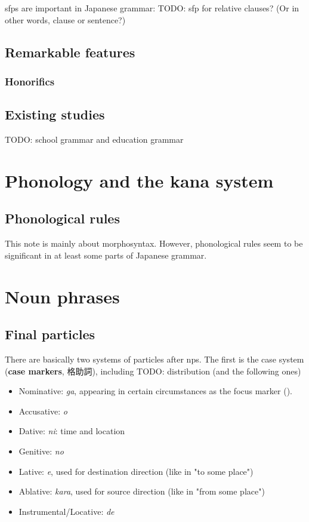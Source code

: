 \documentclass[UTF8, a4paper, oneside, scheme=plain]{ctexart}
\newcommand*{\concept}[1]{\textbf{#1}}
\newcommand{\corpus}[1]{\emph{#1}}
\begin{document}
\acs{sfp}s are important in Japanese grammar:
TODO: sfp for relative clauses? (Or in other words, clause or sentence?)

\subsection{Remarkable features}

\subsubsection{Honorifics}

\subsection{Existing studies}

TODO: school grammar and education grammar

\section{Phonology and the kana system}

\subsection{Phonological rules}

This note is mainly about morphosyntax.
However, phonological rules seem to be significant in at least some parts of Japanese grammar.


\section{Noun phrases}

\subsection{Final particles}

There are basically two systems of particles after \ac{np}s.
The first is the case system (\concept{case markers}, 格助詞), including
TODO: distribution (and the following ones)
\begin{itemize}
    \item Nominative: \corpus{ga}, 
    appearing in certain circumstances as the focus marker ().
    \item Accusative: \corpus{o}
    \item Dative: \corpus{ni}: time and location 
    \item Genitive: \corpus{no} 
    \item Lative: \corpus{e}, used for destination direction (like in "to some place")
    \item Ablative: \corpus{kara}, used for source direction (like in "from some place")
    \item Instrumental/Locative: \corpus{de}
\end{itemize}
\end{document}
